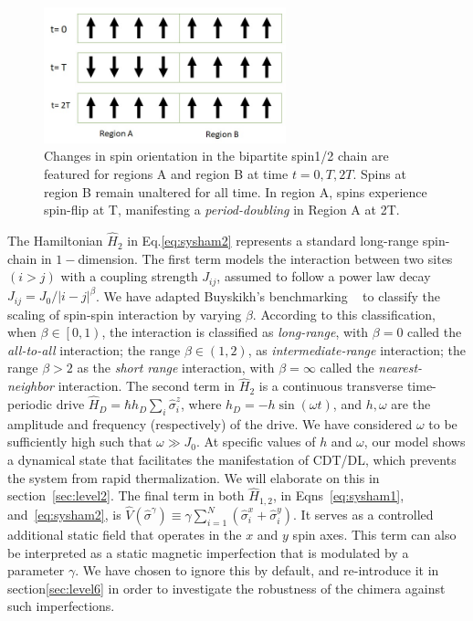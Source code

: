 \documentclass[%
nofootinbib,
reprint,
superscriptaddress,
amsmath,amssymb,showkeys,
aps,
prb,
]{revtex4-2}
\begin{document}
	\begin{figure}[t!]
		\centering
		\includegraphics[width=7.0cm]{pic_regions.jpg}
		\caption{Changes in spin orientation in the bipartite spin1/2 chain are featured for regions A and region B at time $t= 0, T, 2T$. Spins at region B remain unaltered for all time. In region A, spins experience spin-flip at T, manifesting a \textit{period-doubling} in Region A at 2T.}
		\label{Fig:spinflip}
	\end{figure}
	The Hamiltonian $\hat{H}_2$ in Eq.\eqref{eq:sysham2} represents a standard long-range spin-chain in $1-$dimension. The first term models the interaction between two sites $(i>j)$ with a coupling strength $J_{ij}$, assumed to follow a power law decay $J_{ij}={J_0}/{|i-j|^\beta}$. We have adapted Buyskikh's benchmarking ~\cite{buyskikh_entanglement_2016} to classify the scaling of spin-spin interaction by varying $\beta$. According to this classification, when $\beta\in\left[0,1\right)$, the interaction is classified as \textit{long-range}, with $\beta=0$ called the \textit{all-to-all} interaction; the range $\beta\in \left(1,2\right)$, as \textit{intermediate-range} interaction; the range $\beta > 2$ as the  \textit{short range} interaction, with $\beta= \infty$ called the \textit{nearest-neighbor} interaction. The second term in $\hat{H}_2$ is a continuous transverse time-periodic drive $\displaystyle \hat{H}_D=\hbar h_D \sum_i\hat{\sigma}^z_i$, where $\displaystyle h_D = -h\sin{(\omega t)}$, and $h,\omega$ are the amplitude and frequency (respectively) of the drive. We have considered $\omega$ to be sufficiently high such that $\omega\gg J_0$. At specific values of $h$ and $\omega$, our model shows a dynamical state that facilitates the manifestation of CDT/DL, which prevents the system from rapid thermalization. We will elaborate on this in section~\ref{sec:level2}. The final term in both $\hat{H}_{1,2}$, in Eqns~\ref{eq:sysham1}, and~\ref{eq:sysham2}, is $\displaystyle \hat{V}(\hat{\sigma}^{\gamma}) \equiv\gamma  \sum_{i=1}^{N} (\hat{\sigma}^x_i + \hat{\sigma}^y_i)$. It serves as a controlled additional static field that operates in the $x$ and $y$ spin axes.  This term can also be interpreted as a static magnetic imperfection that is modulated by a parameter $\gamma$. We have chosen to ignore this by default, and re-introduce it in section\ref{sec:level6} in order to investigate the robustness of the chimera against such imperfections.
	
\end{document}
